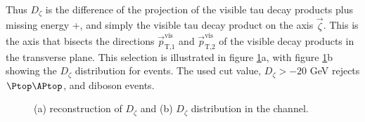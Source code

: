 Thus $D_{\zeta}$ is the difference of the projection of the visible tau decay products plus missing energy \pT+\MET,
and simply the visible tau decay product \pT on the axis $\vec{\zeta}$. This is the axis that bisects 
the directions $\vec{p}_{\text{T,1}}^{\text{vis}}$ and $\vec{p}_{\text{T,2}}^{\text{vis}}$
of the visible decay products in the transverse plane. This selection is illustrated in figure
\ref{fig:mssm_dzeta}a, with figure \ref{fig:mssm_dzeta}b showing the $D_{\zeta}$ distribution
for \emu events. The used cut value, $D_{\zeta} > -20$ GeV rejects $\ttbar$, \Wjets and diboson
events. 

\begin{figure}[h!]
\begin{center}
\end{center}
\caption{(a) reconstruction of $D_{\zeta}$ \cite{cdf-dzeta} and (b) $D_{\zeta}$ distribution in the 
\emu channel\cite{CMS-PAS-HIG-16-037}.}
\label{fig:mssm_dzeta}
\end{figure}



